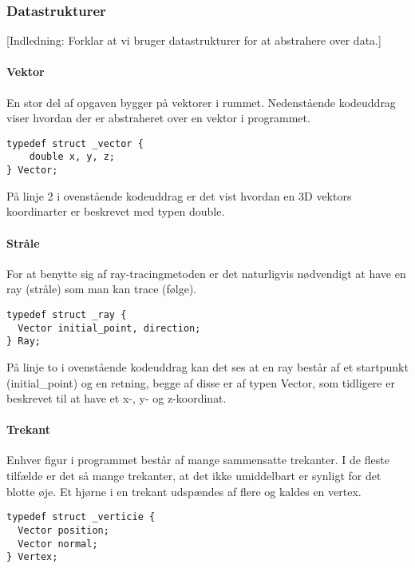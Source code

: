 \subsubsection{Datastrukturer}
[Indledning: Forklar at vi bruger datastrukturer for at abstrahere over data.]
\paragraph{Vektor}
En stor del af opgaven bygger på vektorer i rummet. Nedenstående kodeuddrag viser hvordan der er abstraheret over en vektor i programmet. 

\begin{lstlisting}[style=Cstyle, caption=Struct til vektor]
typedef struct _vector {
    double x, y, z;
} Vector;
\end{lstlisting}

På linje 2 i ovenstående kodeuddrag er det vist hvordan en 3D vektors koordinarter er beskrevet med typen double. 

\paragraph{Stråle}
For at benytte sig af ray-tracingmetoden er det naturligvis nødvendigt at have en ray (stråle) som man kan trace (følge). 

\begin{lstlisting}[style=Cstyle, caption=Struct til ray]
typedef struct _ray {
  Vector initial_point, direction;
} Ray;
\end{lstlisting}

På linje to i ovenstående kodeuddrag kan det ses at en ray består af et startpunkt (initial_point) og en retning, begge af disse er af typen Vector, som tidligere er beskrevet til at have et x-, y- og z-koordinat.

\paragraph{Trekant}
Enhver figur i programmet består af mange sammensatte trekanter. I de fleste tilfælde er det så mange trekanter, at det ikke umiddelbart er synligt for det blotte øje. Et hjørne i en trekant udspændes af flere og kaldes en vertex.
    
\begin{lstlisting}[style=Cstyle, caption=Struct til vertex]
typedef struct _verticie {
  Vector position;
  Vector normal;
} Vertex;
\end{lstlisting}

